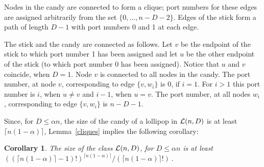 \documentclass{article}
\newcommand{\cL}{{\cal L}}
\newtheorem{corollary}{Corollary}[section]
\begin{document}
Nodes in the candy are connected to form a clique; port numbers for these edges are assigned arbitrarily from the set $\{0, \ldots, n-D-2\}$. 
Edges of the stick form a path of length $D-1$ with port numbers 0 and 1 at each edge. 

The stick and the candy are connected as follows.
Let $v$ be the endpoint of the stick to which port number 1 has been assigned and let $u$ be the other endpoint of the stick (to which port number 0 has been assigned). Notice that $u$ and $v$ coincide, when $D=1$.
Node $v$ is connected to all nodes in the candy. The port number, at node $v$, corresponding to edge  $\{v, w_i\}$ is $0$, if $i=1$. For $i>1$ this port number is $i$, when $u\ne v$ and $i-1$, when $u=v$. The port number, at all nodes $w_i$, corresponding to edge $\{v, w_i\}$ is $n-D-1$.


Since, for $D\le  \alpha n$, the size of the candy of a lollipop in $\cL(n,D)$ is at least $\lceil n(1-\alpha)\rceil$, Lemma~\ref{cliques} implies the following corollary:


\begin{corollary}\label{corLollipops}
The size of the class $\cL(n, D)$, for $D\le  \alpha n$ is at least {$((\lceil n(1-\alpha) \rceil -1)!)^{\lceil n(1-\alpha) \rceil} /(\lceil n(1-\alpha) \rceil !)\,$.}
\end{corollary}
\end{document}
